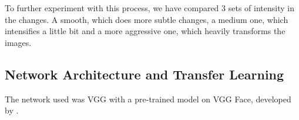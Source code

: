 To further experiment with this process, we have compared 3 sets of intensity in the changes. A smooth, which does more subtle changes, a medium one, which intensifies a little bit and a more aggressive one, which heavily transforms the images.  
\subsection{Network Architecture and Transfer Learning}

The network used was VGG with a pre-trained model on VGG Face, developed by \cite{ParkhiVZ15}.



